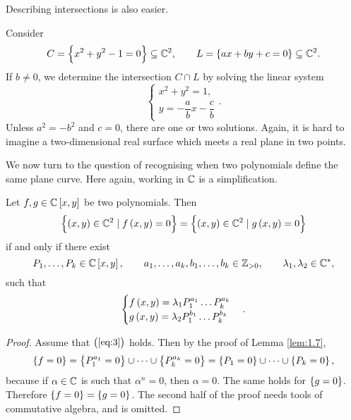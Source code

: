 Describing intersections is also easier.

\begin{example}
Consider
$$ C = \cbr{x^2 + y^2 - 1 = 0} \subseteq \C^2, \qquad L = \cbr{ax + by + c = 0} \subseteq \C^2. $$
If $ b \ne 0 $, we determine the intersection $ C \cap L $ by solving the linear system
$$
\begin{cases}
x^2 + y^2 = 1, \\
y = -\dfrac{a}{b}x - \dfrac{c}{b}
\end{cases}.
$$
Unless $ a^2 = -b^2 $ and $ c = 0 $, there are one or two solutions. Again, it is hard to imagine a two-dimensional real surface which meets a real plane in two points.
\end{example}

\pagebreak

We now turn to the question of recognising when two polynomials define the same plane curve. Here again, working in $ \mathbb{C} $ is a simplification.

\begin{theorem}
\label{thm:2.10}
Let $ f, g \in \C\sbr{x, y} $ be two polynomials. Then
$$ \cbr{\br{x, y} \in \C^2 \mid f\br{x, y} = 0} = \cbr{\br{x, y} \in \C^2 \mid g\br{x, y} = 0} $$
if and only if there exist
$$ P_1, \dots, P_k \in \C\sbr{x, y}, \qquad a_1, \dots, a_k, b_1, \dots, b_k \in \Z_{> 0}, \qquad \lambda_1, \lambda_2 \in \C^*, $$
such that
\begin{equation}
\label{eq:3}
\begin{cases}
f\br{x, y} = \lambda_1 P_1^{a_1} \dots P_k^{a_k} \\
g\br{x, y} = \lambda_2 P_1^{b_1} \dots P_k^{b_k}
\end{cases}.
\end{equation}
\end{theorem}


\begin{proof}
Assume that $ \br{\ref{eq:3}} $ holds. Then by the proof of Lemma \ref{lem:1.7},
$$ \cbr{f = 0} = \cbr{P_1^{a_1} = 0} \cup \dots \cup \cbr{P_k^{a_k} = 0} = \cbr{P_1 = 0} \cup \dots \cup \cbr{P_k = 0}, $$
because if $ \alpha \in \mathbb{C} $ is such that $ \alpha^n = 0 $, then $ \alpha = 0 $. The same holds for $ \cbr{g = 0} $. Therefore $ \cbr{f = 0} = \cbr{g = 0} $. The second half of the proof needs tools of commutative algebra, and is omitted.
\end{proof}

